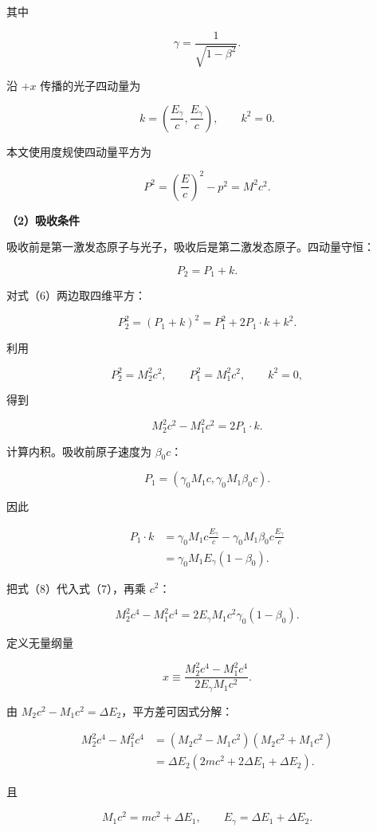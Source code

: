 \documentclass[12pt,a4paper,UTF8]{ctexart}
\begin{document}
其中

\[
\gamma=\frac1{\sqrt{1-\beta^2}}.
\tag{3}
\]

沿 \(+x\) 传播的光子四动量为

\[
k=\left(\frac{E_\gamma}{c},\frac{E_\gamma}{c}\right),
\qquad
k^2=0.
\tag{4}
\]

本文使用度规使四动量平方为

\[
P^2=\left(\frac Ec\right)^2-p^2=M^2c^2.
\tag{5}
\]

\textbf{（2）吸收条件}

吸收前是第一激发态原子与光子，吸收后是第二激发态原子。四动量守恒：

\[
P_2=P_1+k.
\tag{6}
\]

对式（6）两边取四维平方：

\[
P_2^2=(P_1+k)^2=P_1^2+2P_1\cdot k+k^2.
\]

利用

\[
P_2^2=M_2^2c^2,
\qquad
P_1^2=M_1^2c^2,
\qquad
k^2=0,
\]

得到

\[
M_2^2c^2-M_1^2c^2=2P_1\cdot k.
\tag{7}
\]

计算内积。吸收前原子速度为 \(\beta_0c\)：

\[
P_1=\left(\gamma_0M_1c,\gamma_0M_1\beta_0c\right).
\]

因此

\[
\begin{aligned}
P_1\cdot k
&=\gamma_0M_1c\frac{E_\gamma}{c}
-\gamma_0M_1\beta_0c\frac{E_\gamma}{c}\\
&=\gamma_0M_1E_\gamma(1-\beta_0).
\end{aligned}
\tag{8}
\]

把式（8）代入式（7），再乘 \(c^2\)：

\[
M_2^2c^4-M_1^2c^4
=2E_\gamma M_1c^2\gamma_0(1-\beta_0).
\tag{9}
\]

定义无量纲量

\[
x\equiv
\frac{M_2^2c^4-M_1^2c^4}
{2E_\gamma M_1c^2}.
\tag{10}
\]

由 \(M_2c^2-M_1c^2=\Delta E_2\)，平方差可因式分解：

\[
\begin{aligned}
M_2^2c^4-M_1^2c^4
&=(M_2c^2-M_1c^2)(M_2c^2+M_1c^2)\\
&=\Delta E_2
\left(2mc^2+2\Delta E_1+\Delta E_2\right).
\end{aligned}
\tag{11}
\]

且

\[
M_1c^2=mc^2+\Delta E_1,
\qquad
E_\gamma=\Delta E_1+\Delta E_2.
\]
\end{document}

